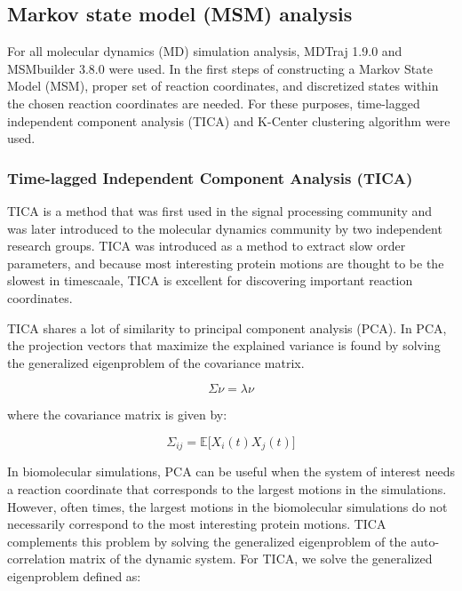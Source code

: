 \subsection{Markov state model (MSM) analysis}
For all molecular dynamics (MD) simulation analysis, MDTraj 1.9.0 and MSMbuilder 3.8.0 were used. \citep{harrigan2017, mcgibbon2015} In the first steps of constructing a Markov State Model (MSM), proper set of reaction coordinates, and discretized states within the chosen reaction coordinates are needed. For these purposes, time-lagged independent component analysis (TICA) and K-Center clustering algorithm were used.

\subsubsection{Time-lagged Independent Component Analysis (TICA)}
TICA is a method that was first used in the signal processing community \citep{molgedey1994} and was later introduced to the molecular dynamics community by two independent research groups. \citep{perezHernandez2013, schwantes2013} TICA was introduced as a method to extract slow order parameters, and because most interesting protein motions are thought to be the slowest in timescaale, TICA is excellent for discovering important reaction coordinates.

TICA shares a lot of similarity to principal component analysis (PCA). In PCA, the projection vectors that maximize the explained variance is found by solving the generalized eigenproblem of the covariance matrix. 

\begin{equation}
\Sigma \nu = \lambda \nu
\end{equation}

where the covariance matrix is given by:

\begin{equation}
\Sigma_{ij} = \mathbb{E} \Big[X_{i}(t)X_{j}(t)\Big]
\end{equation}

In biomolecular simulations, PCA can be useful when the system of interest needs a reaction coordinate that corresponds to the largest motions in the simulations. However, often times, the largest motions in the biomolecular simulations do not necessarily correspond to the most interesting protein motions. TICA complements this problem by solving the generalized eigenproblem of the auto-correlation matrix of the dynamic system. For TICA, we solve the generalized eigenproblem defined as:

